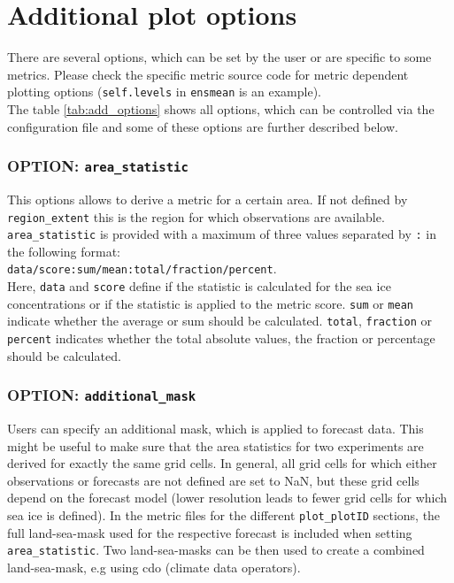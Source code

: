 \documentclass[DIV=10, parskip=full]{scrreprt}
\begin{document}
\section{Additional plot options}\label{subsec:add_options}
There are several options, which can be set by the user or are specific to some metrics. Please check the specific metric source code for metric dependent plotting options (\texttt{self.levels} in \texttt{ensmean} is an example).\\

The table \ref{tab:add_options} shows all options, which can be controlled via the configuration file and some of these options are further described below.

\subsubsection{OPTION: \texttt{area\_statistic}}
This options allows to derive a metric for a certain area. If not defined by \texttt{region\_extent} this is the region for which observations are available. \texttt{area\_statistic} is provided with a maximum of three values separated by \texttt{:} in the following format: \\

\texttt{data/score:sum/mean:total/fraction/percent}. \\

Here, \texttt{data} and \texttt{score} define if the statistic is calculated for the sea ice concentrations or if the statistic is applied to the metric score. \texttt{sum} or \texttt{mean} indicate whether the average or sum should be calculated. \texttt{total}, \texttt{fraction} or \texttt{percent} indicates whether the total absolute values, the fraction or percentage should be calculated.

\subsubsection{OPTION: \texttt{additional\_mask}}
Users can specify an additional mask, which is applied to forecast data. This might be useful to make sure that the area statistics for two experiments are derived for exactly the same grid cells. In general, all grid cells for which either observations or forecasts are not defined are set to NaN, but these grid cells depend on the forecast model (lower resolution leads to fewer grid cells for which sea ice is defined). In the metric files for the different \texttt{plot\_plotID} sections, the full land-sea-mask used for the respective forecast is included when setting \texttt{area\_statistic}. Two land-sea-masks can be then used to create a combined land-sea-mask, e.g using cdo (climate data operators).\\
\end{document}
